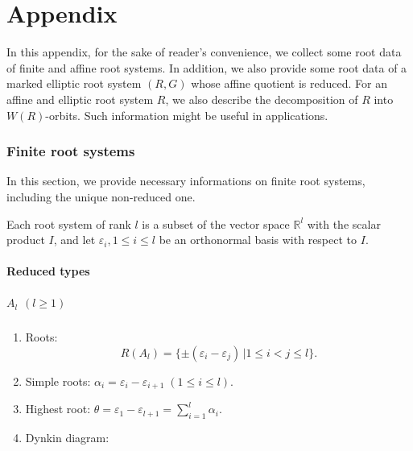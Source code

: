 \documentclass[11pt]{amsart}
\newcommand{\R}{\mathbb{R}}
\newcommand{\vep}{\varepsilon}
\begin{document}
{%
\setcounter{section}{0}
\renewcommand{\thesection}{\Alph{section}}

\part*{Appendix}

In this appendix, for the sake of reader's convenience, we collect some root data of finite and affine root systems.
In addition, we also provide some root data of a marked elliptic root system $(R,G)$ 
whose affine quotient is reduced.
For an affine and elliptic root system $R$, we also describe the decomposition of $R$ into $W(R)$-orbits. Such information might be useful in applications. 

\section{Finite root systems} \label{sect_finite-root-system}
In this section, we provide necessary informations on finite root systems, including the unique non-reduced one. 

Each root system of rank $l$ is a subset of the vector space $\R^l$ with the scalar product $I$, and let ${\vep_i, 1\leq i \leq l}$ be an orthonormal basis with respect to $I$.
\subsection{Reduced types}
\subsubsection{$A_l$\; $(l\geq 1)$}\label{sect_A}
\begin{enumerate}
\item Roots: 
\[ R(A_l)=\{\pm (\vep_i- \vep_j)\, \vert 1\leq i<j\leq l\}. \]
\item Simple roots: \; $\alpha_i=\vep_i-\vep_{i+1}\; (1\leq i\leq l)$. 
\item Highest root: $\theta=\vep_1-\vep_{l+1}=\sum_{i=1}^l \alpha_i$.
\item Dynkin diagram:
\begin{center}
\end{center}
\end{enumerate}

}
\end{document}
